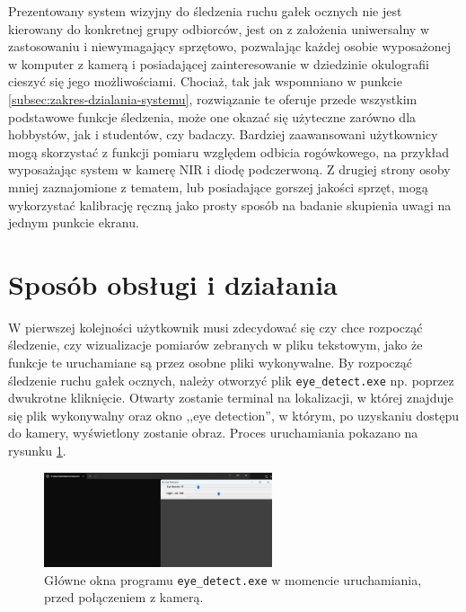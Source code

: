 \documentclass[a4paper,twoside,12pt]{book}
\begin{document}
Prezentowany system wizyjny do śledzenia ruchu gałek ocznych nie jest kierowany do konkretnej grupy odbiorców, jest on z założenia uniwersalny w zastosowaniu i niewymagający sprzętowo, pozwalając każdej osobie wyposażonej w komputer z kamerą i posiadającej zainteresowanie w dziedzinie okulografii cieszyć się jego możliwościami. Chociaż, tak jak wspomniano w punkcie \ref{subsec:zakres-dzialania-systemu}, rozwiązanie te oferuje przede wszystkim podstawowe funkcje śledzenia, może one okazać się użyteczne zarówno dla hobbystów, jak i studentów, czy badaczy. Bardziej zaawansowani użytkownicy mogą skorzystać z funkcji pomiaru względem odbicia rogówkowego, na przykład wyposażając system w kamerę NIR i diodę podczerwoną. Z drugiej strony osoby mniej zaznajomione z tematem, lub posiadające gorszej jakości sprzęt, mogą wykorzystać kalibrację ręczną jako prosty sposób na badanie skupienia uwagi na jednym punkcie ekranu. 

\section{Sposób obsługi i działania}
\label{sec:Sposob-obslugi}

W pierwszej kolejności użytkownik musi zdecydować się czy chce rozpocząć śledzenie, czy wizualizacje pomiarów zebranych w pliku tekstowym, jako że funkcje te uruchamiane są przez osobne pliki wykonywalne. By rozpocząć śledzenie ruchu gałek ocznych, należy otworzyć plik \texttt{eye\_\-detect.exe} np. poprzez dwukrotne kliknięcie. Otwarty zostanie terminal na lokalizacji, w której znajduje się plik wykonywalny oraz okno ,,eye detection'', w którym, po uzyskaniu dostępu do kamery, wyświetlony zostanie obraz. Proces uruchamiania pokazano na rysunku \ref{fig:eye_detect-uruchamianie}.

\begin{figure}[htbp]
	\centering
	\includegraphics[width=0.6\textwidth]{pic/obsługa/okna przy otwarciu.png}
	\caption{Główne okna programu \texttt{eye\_\-detect.exe} w momencie uruchamiania, przed połączeniem z kamerą.}
	\label{fig:eye_detect-uruchamianie}
\end{figure}
\end{document}
